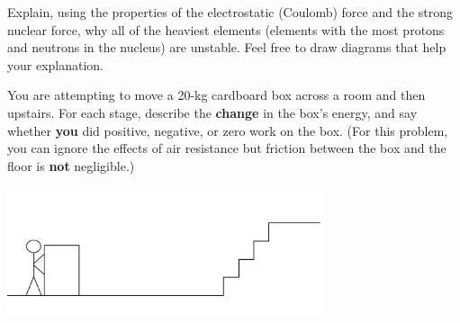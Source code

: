 \documentclass[12pt]{exam}
\begin{document}
\begin{questions}

\question Explain, using the properties of the electrostatic (Coulomb) force and the strong nuclear force, why all of the heaviest elements (elements with the most protons and neutrons in the nucleus) are unstable. Feel free to draw diagrams that help your explanation.
\vspace{3.5in}

\clearpage
\question You are attempting to move a 20-kg cardboard box across a room and then upstairs. For each stage, describe the \textbf{change} in the box's energy, and say whether \textbf{you} did positive, negative, or zero work on the box. (For this problem, you can ignore the effects of air resistance but friction between the box and the floor is \textbf{not} negligible.)
\begin{center}
	\includegraphics[width=0.7\textwidth]{../images/test2_stairs.png}
	\end{center}
\end{questions}
\end{document}
